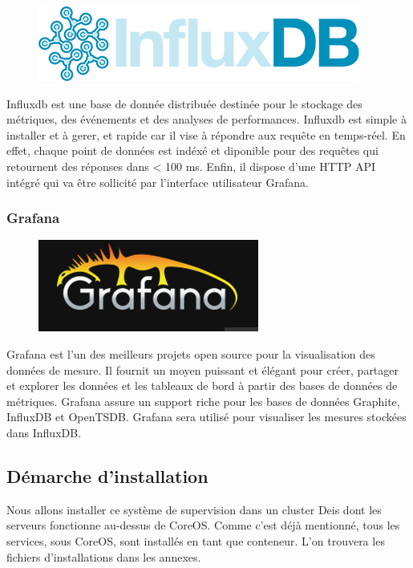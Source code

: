 \begin{onehalfspace}
\begin{figure}
\centering
\includegraphics[scale=0.2]{chapitre5/assets/influxdb}
\end{figure}
\noindent Influxdb est une base de donnée distribuée destinée pour le stockage des métriques, des événements et des analyses de performances. Influxdb est simple à installer et à gerer, et rapide car il vise à répondre aux requête en temps-réel. En effet, chaque point de données est indéxé et diponible pour des requêtes qui retournent des réponses dans < 100 ms. Enfin, il dispose d'une HTTP API intégré qui va être sollicité par l'interface utilisateur Grafana.

\subsubsection*{Grafana}

\begin{figure}
\centering
\includegraphics[scale=0.3]{chapitre5/assets/grafana}
\end{figure}
\noindent Grafana est l'un des meilleurs projets open source pour la visualisation des données de mesure. Il fournit un moyen puissant et élégant pour créer, partager et explorer les données et les tableaux de bord à partir des bases de données de métriques. Grafana assure un support riche pour les bases de données Graphite, InfluxDB et OpenTSDB. Grafana sera utilisé pour visualiser les mesures stockées dans InfluxDB.


\subsection{Démarche d'installation}

Nous allons installer ce système de supervision dans un cluster Deis dont les serveurs fonctionne au-dessus de CoreOS. Comme c'est déjà mentionné, tous les services, sous CoreOS, sont installés en tant que conteneur. L'on trouvera les fichiers d'installations dans les annexes.  


\end{onehalfspace}
